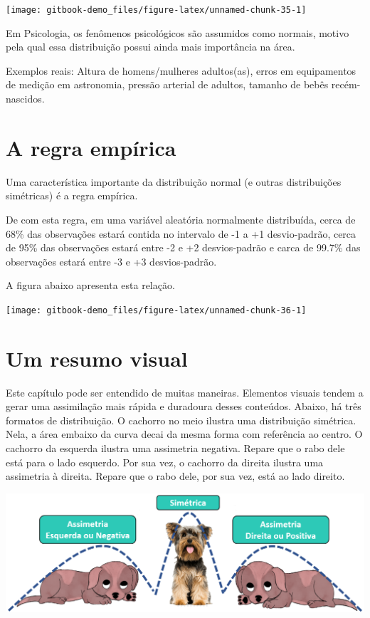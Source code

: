 \documentclass[
]{book}
\begin{document}
\begin{center}\texttt{[image: gitbook-demo\_files/figure-latex/unnamed-chunk-35-1]} \end{center}

Em Psicologia, os fenômenos psicológicos são assumidos como normais, motivo pela qual essa distribuição possui ainda mais importância na área.

Exemplos reais: Altura de homens/mulheres adultos(as), erros em equipamentos de medição em astronomia, pressão arterial de adultos, tamanho de bebês recém-nascidos.

\hypertarget{a-regra-empuxedrica}{%
\section{A regra empírica}\label{a-regra-empuxedrica}}

Uma característica importante da distribuição normal (e outras distribuições simétricas) é a regra empírica.

De com esta regra, em uma variável aleatória normalmente distribuída, cerca de 68\% das observações estará contida no intervalo de -1 a +1 desvio-padrão, cerca de 95\% das observações estará entre -2 e +2 desvios-padrão e carca de 99.7\% das observações estará entre -3 e +3 desvios-padrão.

A figura abaixo apresenta esta relação.

\begin{center}\texttt{[image: gitbook-demo\_files/figure-latex/unnamed-chunk-36-1]} \end{center}

\hypertarget{um-resumo-visual}{%
\section{Um resumo visual}\label{um-resumo-visual}}

Este capítulo pode ser entendido de muitas maneiras. Elementos visuais tendem a gerar uma assimilação mais rápida e duradoura desses conteúdos. Abaixo, há três formatos de distribuição. O cachorro no meio ilustra uma distribuição simétrica. Nela, a área embaixo da curva decai da mesma forma com referência ao centro. O cachorro da esquerda ilustra uma assimetria negativa. Repare que o rabo dele está para o lado esquerdo. Por sua vez, o cachorro da direita ilustra uma assimetria à direita. Repare que o rabo dele, por sua vez, está ao lado direito.

\includegraphics{./img/cap_desc_assimetria.png}
\end{document}
